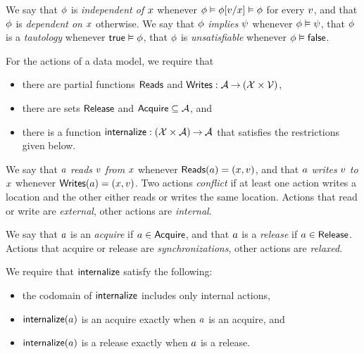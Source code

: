 We say that $\phi$ is \emph{independent of $x$} whenever
$\phi \vDash \phi[v/x] \vDash \phi$ for every $v$, and that
$\phi$ is \emph{dependent on $x$} otherwise.  We say that $\phi$
\emph{implies} $\psi$ whenever $\phi\vDash\psi$, that $\phi$ is a
\emph{tautology} whenever $\mathsf{true}\vDash\phi$, that $\phi$ is
\emph{unsatisfiable} whenever $\phi\vDash\mathsf{false}$.

For the actions of a data model, we require that
\begin{itemize}
\item there are partial functions $\mathsf{Reads}$ and
  $\mathsf{Writes}: \mathcal{A} \mathbin\rightarrow (\mathcal{X} \times \mathcal{V})$,
\item there are sets $\mathsf{Release}$ and $\mathsf{Acquire} \subseteq\mathcal{A}$, and
\item there is a function $\mathsf{internalize}: (\mathcal{X}\times\mathcal{A}) \mathbin\rightarrow \mathcal{A}$ that
  satisfies the restrictions given below.
\end{itemize}

We say that $a$ \emph{reads} $v$ \emph{from} $x$ whenever
$\mathsf{Reads}(a) = (x,v)$, and that $a$ \emph{writes} $v$
\emph{to} $x$ whenever $\mathsf{Writes}(a) = (x,v)$.  Two actions
\emph{conflict} if at least one action writes a location and the other either
reads or writes the same location.  Actions that read or write are
\emph{external}, other actions are \emph{internal}.

We say that $a$ is an \emph{acquire} if $a\in\mathsf{Acquire}$, and that $a$
is a \emph{release} if $a\in\mathsf{Release}$.  Actions that acquire or release are
\emph{synchronizations}, other actions are \emph{relaxed}.

We require that $\mathsf{internalize}$ satisfy the following:
\begin{itemize}
\item the codomain of $\mathsf{internalize}$ includes only internal actions, %
\item $\mathsf{internalize}(a)$ is an acquire exactly when $a$ is an acquire, and 
\item $\mathsf{internalize}(a)$ is a release exactly when $a$ is a release.
\end{itemize}


